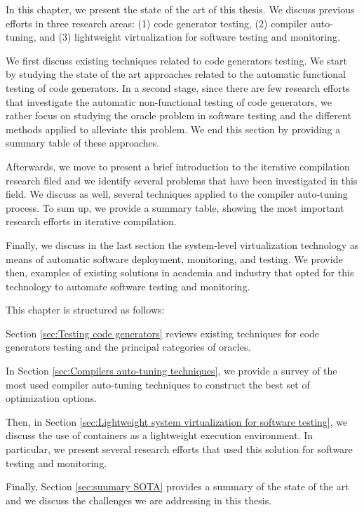 
In this chapter, we present the state of the art of this thesis. We discuss previous efforts in three research areas: (1) code generator testing, (2) compiler auto-tuning, and (3) lightweight virtualization for software testing and monitoring.

We first discuss existing techniques related to code generators testing. We start by studying the state of the art approaches related to the automatic functional testing of code generators. In a second stage, since there are few research efforts that investigate the automatic non-functional testing of code generators, we rather focus on studying the oracle problem in software testing and the different methods applied to alleviate this problem. We end this section by providing a summary table of these approaches.

Afterwards, we move to present a brief introduction to the iterative compilation research filed and we identify several problems that have been investigated in this field. We discuss as well, several techniques applied to the compiler auto-tuning process. To sum up, we provide a summary table, showing the most important research efforts in iterative compilation.

Finally, we discuss in the last section the system-level virtualization technology as means of automatic software deployment, monitoring, and testing. We provide then, examples of existing solutions in academia and industry that opted for this technology to automate software testing and monitoring.

This chapter is structured as follows: 

Section \ref{sec:Testing code generators} reviews existing techniques for code generators testing and the principal categories of oracles. 

In Section \ref{sec:Compilers auto-tuning techniques}, we provide a survey of the most used compiler auto-tuning techniques to construct the best set of optimization options. 

Then, in Section \ref{sec:Lightweight system virtualization for software testing}, we discuss the use of containers as a lightweight execution environment. In particular, we present several research efforts that used this solution for software testing and monitoring. 

Finally, Section \ref{sec:suumary SOTA} provides a summary of the state of the art and we discuss the challenges we are addressing in this thesis.

